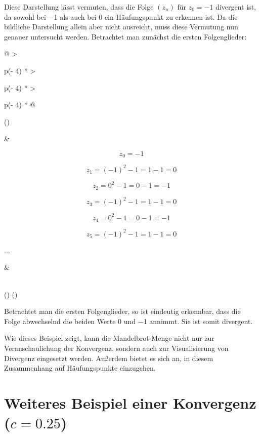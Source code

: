 \documentclass[a4paper, 12pt]{book}
\begin{document}

Diese Darstellung lässt vermuten, dass die Folge
\(\left( z_{n} \right)\) für \(z_{0} =  - 1\) divergent ist, da
sowohl bei \(-\)1 als auch bei 0 ein Häufungspunkt zu erkennen ist. Da
die bildliche Darstellung allein aber nicht ausreicht, muss diese
Vermutung nun genauer untersucht werden. Betrachtet man zunächst die
ersten Folgenglieder:

\begin{longtable}[]{@{}
  >{\raggedright\arraybackslash}p{(\columnwidth - 4\tabcolsep) * }
  >{\raggedright\arraybackslash}p{(\columnwidth - 4\tabcolsep) * }
  >{\raggedright\arraybackslash}p{(\columnwidth - 4\tabcolsep) * }@{}}
\toprule()
\begin{minipage}[b]{\linewidth}\raggedright
\end{minipage} & \begin{minipage}[b]{\linewidth}\raggedright
\[z_{0} =  - 1\]

\[z_{1} = ( - 1)^{2} - 1 = 1 - 1 = 0\]

\[z_{2} = 0^{2} - 1 = 0 - 1 =  - 1\]

\[z_{3} = ( - 1)^{2} - 1 = 1 - 1 = 0\]

\[z_{4} = 0^{2} - 1 = 0 - 1 =  - 1\]

\[z_{5} = ( - 1)^{2} - 1 = 1 - 1 = 0\]

...
\end{minipage} & \begin{minipage}[b]{\linewidth}\raggedright
\end{minipage} \\
\midrule()
\endhead
\bottomrule()
\end{longtable}

Betrachtet man die ersten Folgenglieder, so ist eindeutig erkennbar,
dass die Folge abwechselnd die beiden Werte 0 und \(-\)1 annimmt. Sie
ist somit divergent.

Wie dieses Beispiel zeigt, kann die Mandelbrot-Menge nicht nur zur
Veranschaulichung der Konvergenz, sondern auch zur Visualisierung von
Divergenz eingesetzt werden. Außerdem bietet es sich an, in diesem
Zusammenhang auf Häufungspunkte einzugehen.

\section{Weiteres Beispiel einer Konvergenz ($c=0.25$)}
\end{document}
